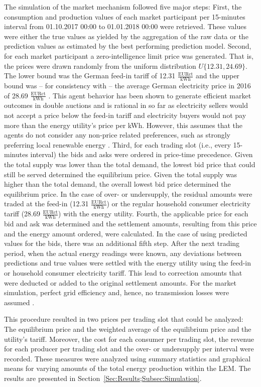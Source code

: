The simulation of the market mechanism followed five major steps: First, the consumption and production values of each market participant per 15-minutes interval from 01.10.2017 00:00 to 01.01.2018 00:00 were retrieved. These values were either the true values as yielded by the aggregation of the raw data or the prediction values as estimated by the best performing prediction model. Second, for each market participant a zero-intelligence limit price was generated. That is, the prices were drawn randomly from the uniform distribution $\textit{U}\{12.31,24.69\}$. The lower bound was the German feed-in tariff of 12.31 $\frac{\text{EURct}}{\text{kWh}}$ and the upper bound was -- for consistency with \citet{Mengelkamp:2018a} -- the average German electricity price in 2016 of 28.69 $\frac{\text{EURct}}{\text{kWh}}$ \citep{Heidjann:2017}. This agent behavior has been shown to generate efficient market outcomes in double auctions \citep{Gode:1993} and is rational in so far as electricity sellers would not accept a price below the feed-in tariff and electricity buyers would not pay more than the energy utility's price per kWh. However, this assumes that the agents do not consider any non-price related preferences, such as strongly preferring local renewable energy \citep{Mengelkamp:2018a}. Third, for each trading slot (i.e., every 15-minutes interval) the bids and asks were ordered in price-time precedence. Given the total supply was lower than the total demand, the lowest bid price that could still be served determined the equilibrium price. Given the total supply was higher than the total demand, the overall lowest bid price determined the equilibrium price. In the case of over- or undersupply, the residual amounts were traded at the feed-in (12.31 $\frac{\text{EURct}}{\text{kWh}}$) or the regular household consumer electricity tariff (28.69 $\frac{\text{EURct}}{\text{kWh}}$) with the energy utility. Fourth, the applicable price for each bid and ask was determined and the settlement amounts, resulting from this price and the energy amount ordered, were calculated. In the case of using predicted values for the bids, there was an additional fifth step. After the next trading period, when the actual energy readings were known, any deviations between predictions and true values were settled with the energy utility using the feed-in or household consumer electricity tariff. This lead to correction amounts that were deducted or added to the original settlement amounts. For the market simulation, perfect grid efficiency and, hence, no transmission losses were assumed \citep{Mengelkamp:2017:Trading}.

This procedure resulted in two prices per trading slot that could be analyzed: The equilibrium price and the weighted average of the equilibrium price and the utility's tariff. Moreover, the cost for each consumer per trading slot, the revenue for each producer per trading slot and the over- or undersupply per interval were recorded. These measures were analyzed using summary statistics and graphical means for varying amounts of the total energy production within the LEM. The results are presented in Section~\ref{Sec:Results;Subsec:Simulation}.



